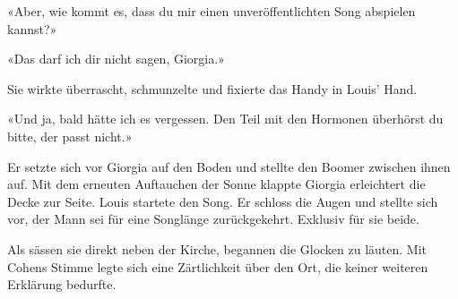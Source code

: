 «Aber, wie kommt es, dass du mir einen unveröffentlichten Song abspielen
kannst?»

«Das darf ich dir nicht sagen, Giorgia.»

Sie wirkte überrascht, schmunzelte und fixierte das Handy in Louis’
Hand.

«Und ja, bald hätte ich es vergessen. Den Teil mit den Hormonen 
überhörst du bitte, der passt nicht.»

Er setzte sich vor Giorgia auf den Boden und stellte den Boomer zwischen
ihnen auf. Mit dem erneuten Auftauchen der Sonne klappte Giorgia
erleichtert die Decke zur Seite.
Louis startete den Song. Er schloss die Augen und stellte sich vor, der Mann
sei für eine Songlänge zurückgekehrt. Exklusiv für sie beide. 

Als sässen sie direkt neben der Kirche, begannen die Glocken zu läuten. Mit 
Cohens Stimme legte sich eine Zärtlichkeit über den Ort, die keiner weiteren Erklärung bedurfte.  
 

